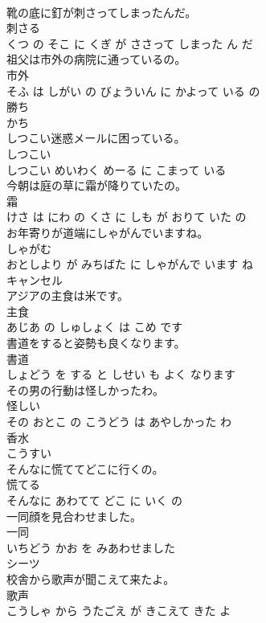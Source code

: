 \documentclass[8pt]{extreport}
\begin{document}
\begin{CJK}{UTF8}{min}
\\	靴の底に釘が刺さってしまったんだ。	
\\	刺さる 
\\	くつ の そこ に くぎ が ささって しまった ん だ			
\\	祖父は市外の病院に通っているの。	
\\	市外 
\\	そふ は しがい の びょういん に かよって いる の			
\\	勝ち	
\\	かち		
\\	しつこい迷惑メールに困っている。	
\\	しつこい 
\\	しつこい めいわく めーる に こまって いる			
\\	今朝は庭の草に霜が降りていたの。	
\\	霜 
\\	けさ は にわ の くさ に しも が おりて いた の			
\\	お年寄りが道端にしゃがんでいますね。	
\\	しゃがむ 
\\	おとしより が みちばた に しゃがんで います ね			
\\	キャンセル	
\\	アジアの主食は米です。	
\\	主食 
\\	あじあ の しゅしょく は こめ です			
\\	書道をすると姿勢も良くなります。	
\\	書道 
\\	しょどう を する と しせい も よく なります			
\\	その男の行動は怪しかったわ。	
\\	怪しい 
\\	その おとこ の こうどう は あやしかった わ			
\\	香水	
\\	こうすい		
\\	そんなに慌ててどこに行くの。	
\\	慌てる 
\\	そんなに あわてて どこ に いく の			
\\	一同顔を見合わせました。	
\\	一同 
\\	いちどう かお を みあわせました			
\\	シーツ	
\\	校舎から歌声が聞こえて来たよ。	
\\	歌声 
\\	こうしゃ から うたごえ が きこえて きた よ			

\end{CJK}
\end{document}
